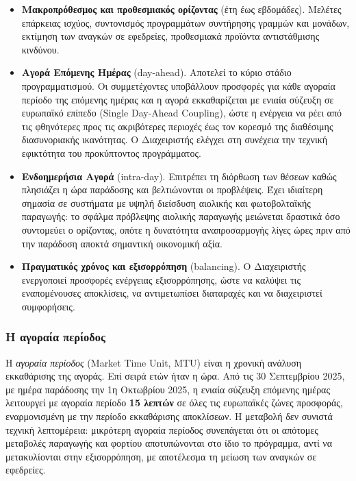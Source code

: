 \begin{itemize}
\item \textbf{Μακροπρόθεσμος και προθεσμιακός ορίζοντας} (έτη έως εβδομάδες). Μελέτες
      επάρκειας ισχύος, συντονισμός προγραμμάτων συντήρησης γραμμών και μονάδων, εκτίμηση
      των αναγκών σε εφεδρείες, προθεσμιακά προϊόντα αντιστάθμισης κινδύνου.
\item \textbf{Αγορά Επόμενης Ημέρας} (day-ahead). Αποτελεί το κύριο στάδιο
      προγραμματισμού. Οι συμμετέχοντες υποβάλλουν προσφορές για κάθε αγοραία περίοδο της
      επόμενης ημέρας και η αγορά εκκαθαρίζεται με ενιαία σύζευξη σε ευρωπαϊκό επίπεδο
      (Single Day-Ahead Coupling), ώστε η ενέργεια να ρέει από τις φθηνότερες προς τις
      ακριβότερες περιοχές έως τον κορεσμό της διαθέσιμης διασυνοριακής ικανότητας. Ο
      Διαχειριστής ελέγχει στη συνέχεια την τεχνική εφικτότητα του προκύπτοντος
      προγράμματος.
\item \textbf{Ενδοημερήσια Αγορά} (intra-day). Επιτρέπει τη διόρθωση των θέσεων καθώς
      πλησιάζει η ώρα παράδοσης και βελτιώνονται οι προβλέψεις. Έχει ιδιαίτερη σημασία σε
      συστήματα με υψηλή διείσδυση αιολικής και φωτοβολταϊκής παραγωγής: το σφάλμα
      πρόβλεψης αιολικής παραγωγής μειώνεται δραστικά όσο συντομεύει ο ορίζοντας, οπότε η
      δυνατότητα αναπροσαρμογής λίγες ώρες πριν από την παράδοση αποκτά σημαντική
      οικονομική αξία.
\item \textbf{Πραγματικός χρόνος και εξισορρόπηση} (balancing). Ο Διαχειριστής ενεργοποιεί
      προσφορές ενέργειας εξισορρόπησης, ώστε να καλύψει τις εναπομένουσες αποκλίσεις, να
      αντιμετωπίσει διαταραχές και να διαχειριστεί συμφορήσεις.
\end{itemize}

\subsubsection*{Η αγοραία περίοδος}

Η \emph{αγοραία περίοδος} (Market Time Unit, MTU) είναι η χρονική ανάλυση εκκαθάρισης της
αγοράς. Επί σειρά ετών ήταν η ώρα. Από τις 30 Σεπτεμβρίου 2025, με ημέρα παράδοσης την 1η
Οκτωβρίου 2025, η ενιαία σύζευξη επόμενης ημέρας λειτουργεί με αγοραία περίοδο
\textbf{15 λεπτών} σε όλες τις ευρωπαϊκές ζώνες προσφοράς, εναρμονισμένη με την περίοδο
εκκαθάρισης αποκλίσεων. Η μεταβολή δεν συνιστά τεχνική λεπτομέρεια: μικρότερη αγοραία
περίοδος συνεπάγεται ότι οι απότομες μεταβολές παραγωγής και φορτίου αποτυπώνονται στο ίδιο
το πρόγραμμα, αντί να μετακυλίονται στην εξισορρόπηση, με αποτέλεσμα τη μείωση των αναγκών
σε εφεδρείες.

